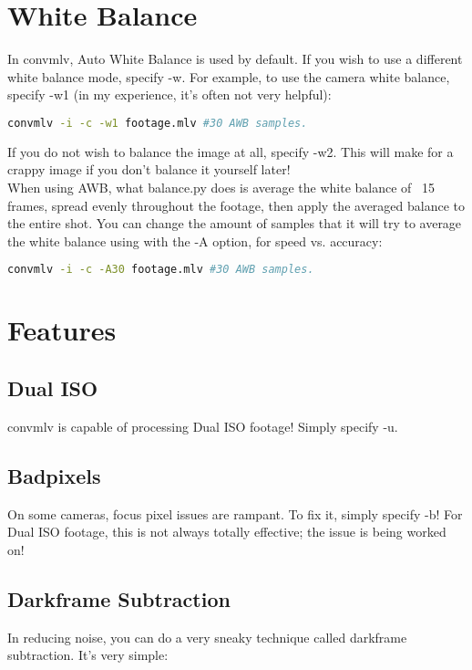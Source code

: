 \documentclass[a4paper,12pt]{article}
\begin{document}
\section{White Balance}
	In convmlv, Auto White Balance is used by default. If you wish to use a different white balance mode, specify -w. For example, to use
	the camera white balance, specify -w1 (in my experience, it's often not very helpful):
	
\begin{lstlisting}[language=bash]
	convmlv -i -c -w1 footage.mlv #30 AWB samples.
\end{lstlisting}
	
	If you do not wish to balance the image at all, specify -w2. This will make for a crappy image if you don't balance it yourself later!\\
	
	When using AWB, what balance.py does is average the white balance of ~15 frames, spread evenly
	throughout the footage, then apply the averaged balance to the entire shot. You can change the amount of samples that it will try to 
	average the white balance using with the -A option, for speed vs. accuracy:
	
\begin{lstlisting}[language=bash]
	convmlv -i -c -A30 footage.mlv #30 AWB samples.
\end{lstlisting}

\section{Features}
	\subsection{Dual ISO}
		convmlv is capable of processing Dual ISO footage! Simply specify -u.
	
	\subsection{Badpixels}
		On some cameras, focus pixel issues are rampant. To fix it, simply specify -b! For Dual ISO footage, this is not always totally
		effective; the issue is being worked on!
	
	\subsection{Darkframe Subtraction}
		In reducing noise, you can do a very sneaky technique called darkframe subtraction. It's very simple:
		
\end{document}
